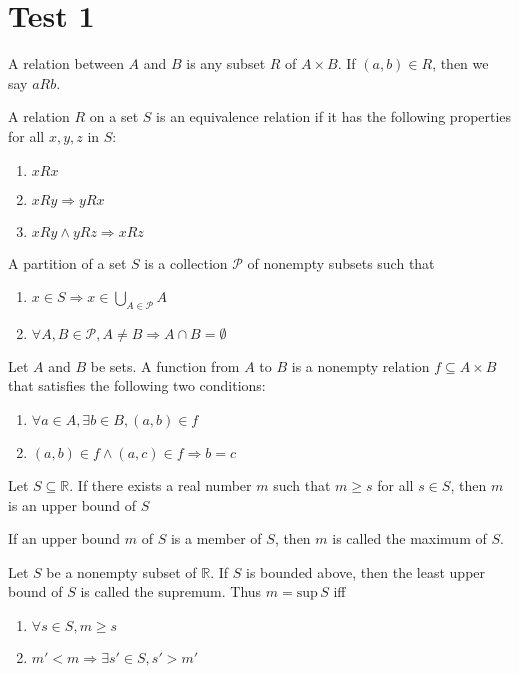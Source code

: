 \documentclass[nobib,notoc]{tufte-handout}
\begin{document}
\section{Test 1}
\begin{defi}[Relation]
	A relation between \(A\) and \(B\) is any subset \(R\) of \(A\times B\). If \((a,b)\in R\), then we say \(aRb\).
\end{defi}
\begin{defi}
	A relation \(R\) on a set \(S\) is an equivalence relation if it has the following properties for all \(x,y,z\) in \(S\):
	\begin{enumerate}
		\item \(xRx\)\qquad{}
		\item \(xRy\Rightarrow yRx\)\qquad{}
		\item \(xRy\wedge yRz\Rightarrow xRz\)\qquad{}
	\end{enumerate}
\end{defi}
A partition of a set \(S\) is a collection \(\mathscr{P}\) of nonempty subsets such that
\begin{enumerate}
	\item \(x\in S\Rightarrow x\in\bigcup_{A\in\mathscr{P}}A\)
	\item \(\forall A,B\in\mathscr{P}, A\neq B\Rightarrow A\cap B=\emptyset\)
\end{enumerate}
\begin{defi}[Function]
	Let \(A\) and \(B\) be sets. A function from \(A\) to \(B\) is a nonempty relation \(f\subseteq A\times B\) that satisfies the following two conditions:
	\begin{enumerate}
		\item \(\forall a\in A,\exists b\in B, (a,b)\in f\)
		\item \((a,b)\in f\wedge (a,c)\in f\Rightarrow b=c\)
	\end{enumerate}
\end{defi}
\begin{defi}
	Let \(S\subseteq\mathbb{R}\). If there exists a real number \(m\) such that \(m\geq s\) for all \(s\in S\), then \(m\) is an upper bound of \(S\)
\end{defi}
\begin{defi}[Maximum]
If an upper bound \(m\) of \(S\) is a member of \(S\), then \(m\) is called the maximum of \(S\).
\end{defi}
\begin{defi}[Supremum]
	Let \(S\) be a nonempty subset of \(\mathbb{R}\). If \(S\) is bounded above, then the least upper bound of \(S\) is called the supremum. Thus \(m=\text{sup}\,S\) iff
	\begin{enumerate}
		\item \(\forall s\in S, m\geq s\)
		\item \(m'<m\Rightarrow \exists s'\in S, s'>m'\)
	\end{enumerate}
\end{defi}
\end{document}
